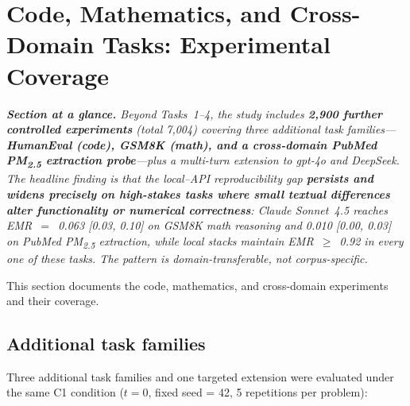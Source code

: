\documentclass[11pt]{article}
\begin{document}
\section{Code, Mathematics, and Cross-Domain Tasks: Experimental Coverage}\label{sec:s11}

\textit{\textbf{Section at a glance.} Beyond Tasks~1--4, the study includes \textbf{2{,}900 further controlled experiments} (total 7{,}004) covering three additional task families---\textbf{HumanEval (code), GSM8K (math), and a cross-domain PubMed PM\textsubscript{2.5} extraction probe}---plus a multi-turn extension to gpt-4o and DeepSeek. The headline finding is that the local--API reproducibility gap \textbf{persists and widens precisely on high-stakes tasks where small textual differences alter functionality or numerical correctness}: Claude Sonnet~4.5 reaches EMR~$=$~0.063 [0.03, 0.10] on GSM8K math reasoning and 0.010 [0.00, 0.03] on PubMed PM\textsubscript{2.5} extraction, while local stacks maintain EMR~$\geq$~0.92 in every one of these tasks. The pattern is \emph{domain-transferable}, not corpus-specific.}

This section documents the code, mathematics, and cross-domain experiments and their coverage.

\subsection{Additional task families}

Three additional task families and one targeted extension were evaluated under the same C1 condition ($t{=}0$, fixed seed = 42, 5 repetitions per problem):
\end{document}
